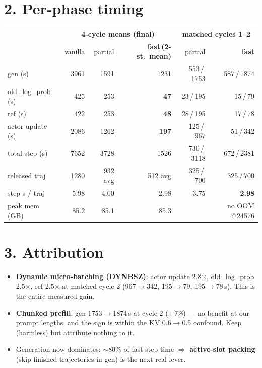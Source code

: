 \documentclass[10pt]{article}
\begin{document}
\section*{2. Per-phase timing}
\small
\begin{tabular}{lrrr|rr}
\toprule
 & \multicolumn{3}{c|}{\textbf{4-cycle means (final)}} & \multicolumn{2}{c}{\textbf{matched cycles 1--2}}\\
 & vanilla & partial & \textbf{fast\,(2-st.\ mean)} & partial & \textbf{fast}\\
\midrule
gen (s) & 3961 & 1591 & 1231 & 553\,/\,1753 & 587\,/\,1874\\
old\_log\_prob (s) & 425 & 253 & \textbf{47} & 23\,/\,195 & 15\,/\,79\\
ref (s) & 422 & 253 & \textbf{48} & 28\,/\,195 & 17\,/\,78\\
actor update (s) & 2086 & 1262 & \textbf{197} & 125\,/\,967 & 51\,/\,342\\
total step (s) & 7652 & 3728 & 1526 & 730\,/\,3118 & 672\,/\,2381\\
released traj & 1280 & 932 avg & 512 avg & 325\,/\,700 & 325\,/\,700\\
step-s / traj & 5.98 & 4.00 & 2.98 & 3.75 & \textbf{2.98}\\
peak mem (GB) & 85.2 & 85.1 & 85.3 & & no OOM @24576\\
\bottomrule
\end{tabular}
\normalsize

\section*{3. Attribution}
\begin{itemize}
\item \textbf{Dynamic micro-batching (DYNBSZ)}: actor update 2.8$\times$, old\_log\_prob
2.5$\times$, ref 2.5$\times$ at matched cycle 2 (967$\to$342, 195$\to$79, 195$\to$78\,s).
This is the entire measured gain.
\item \textbf{Chunked prefill}: gen 1753$\to$1874\,s at cycle 2 (\emph{$+$7\%}) --- no benefit at
our prompt lengths, and the sign is within the KV 0.6$\to$0.5 confound. Keep (harmless) but
attribute nothing to it.
\item Generation now dominates: $\sim$80\% of fast step time $\Rightarrow$ \textbf{active-slot
packing} (skip finished trajectories in gen) is the next real lever.
\end{itemize}
\end{document}
